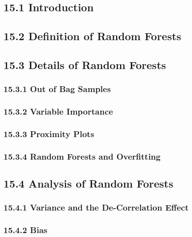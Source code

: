 \documentclass[11pt]{article}
\begin{document}
\subsection{15.1 Introduction}\label{introduction}

\subsection{15.2 Definition of Random
Forests}\label{definition-of-random-forests}

\subsection{15.3 Details of Random
Forests}\label{details-of-random-forests}

\subsubsection{15.3.1 Out of Bag Samples}\label{out-of-bag-samples}

\subsubsection{15.3.2 Variable Importance}\label{variable-importance}

\subsubsection{15.3.3 Proximity Plots}\label{proximity-plots}

\subsubsection{15.3.4 Random Forests and
Overfitting}\label{random-forests-and-overfitting}

\subsection{15.4 Analysis of Random
Forests}\label{analysis-of-random-forests}

\subsubsection{15.4.1 Variance and the De-Correlation
Effect}\label{variance-and-the-de-correlation-effect}

\subsubsection{15.4.2 Bias}\label{bias}
\end{document}
